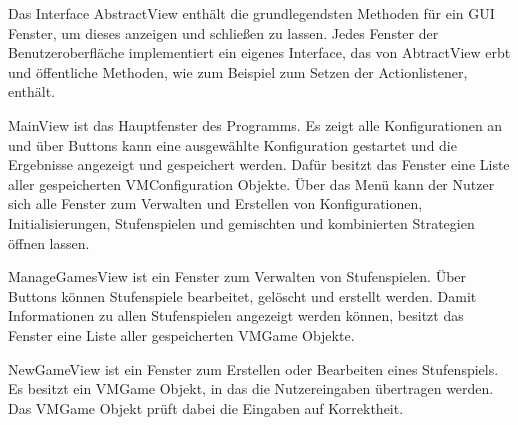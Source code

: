 Das Interface AbstractView enthält die grundlegendsten Methoden für ein GUI Fenster, um dieses anzeigen und schließen zu lassen. Jedes Fenster der Benutzeroberfläche implementiert ein eigenes Interface, das von AbtractView erbt und öffentliche Methoden, wie zum Beispiel zum Setzen der Actionlistener, enthält.

MainView ist das Hauptfenster des Programms. Es zeigt alle Konfigurationen an und über Buttons kann eine ausgewählte Konfiguration gestartet und die Ergebnisse angezeigt und gespeichert werden. Dafür besitzt das Fenster eine Liste aller gespeicherten VMConfiguration Objekte.
Über das Menü kann der Nutzer sich alle Fenster zum Verwalten und Erstellen von Konfigurationen, Initialisierungen, Stufenspielen und gemischten und kombinierten Strategien öffnen lassen.

ManageGamesView ist ein Fenster zum Verwalten von Stufenspielen. Über Buttons können Stufenspiele bearbeitet, gelöscht und erstellt werden. Damit Informationen zu allen Stufenspielen angezeigt werden können, besitzt das Fenster eine Liste aller gespeicherten VMGame Objekte. 

NewGameView ist ein Fenster zum Erstellen oder Bearbeiten eines Stufenspiels. Es besitzt ein VMGame Objekt, in das die Nutzereingaben übertragen werden. Das VMGame Objekt prüft dabei die Eingaben auf Korrektheit. 

